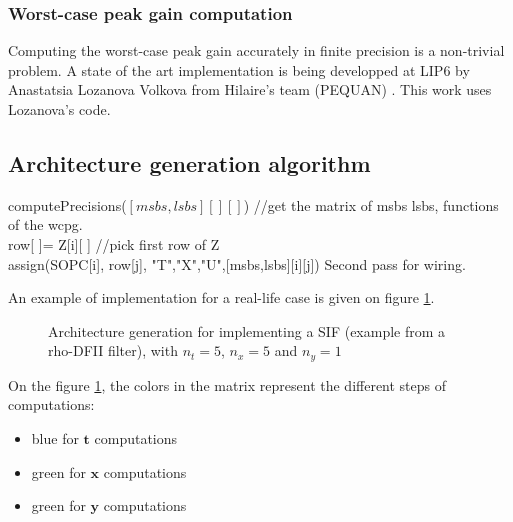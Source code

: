 		\subsubsection{Worst-case peak gain computation}
			Computing the worst-case peak gain accurately in finite precision is a non-trivial problem.
			A state of the art implementation is being developped at LIP6 by Anastatsia Lozanova Volkova from Hilaire's team (PEQUAN) \cite{Volk15a}.
			This work uses Lozanova's code.


\subsection{Architecture generation algorithm}

	\begin{algorithm}[H]
	computePrecisions($[msbs,lsbs][][]$) //get the matrix of msbs lsbs, functions of the wcpg. \\
	 {
	 	row[ ]= Z[i][ ] //pick first row of Z \\
	 	 {
	 		assign(SOPC[i], row[j], {"T","X","U"},[msbs,lsbs][i][j])
	 	}
		Second pass for wiring.
	}
	\end{algorithm}

	An example of implementation for a real-life case is given on figure \ref{fig:SIFimpl}.

	\begin{figure}[!h]
	\begin{center}
	\scalebox{6.6}{}
	\end{center}
	\caption{ Architecture generation for implementing a SIF (example from a rho-DFII filter), with $n_t=5$, $n_x=5$ and $n_y=1$ \label{fig:SIFimpl}}
	\end{figure}

	On the figure \ref{fig:SIFimpl}, the colors in the matrix represent the different steps of computations: \vspace{-9pt}
	\begin{itemize}
		\item blue for $\boldsymbol{t}$ computations \vspace{-10pt}
		\item green for $\boldsymbol{x}$ computations \vspace{-10pt}
		\item green for $\boldsymbol{y}$ computations \vspace{-8pt}
	\end{itemize}

